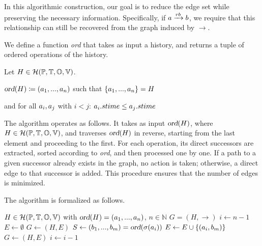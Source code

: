 \documentclass[12pt]{article}
\begin{document}
In this algorithmic construction, our goal is to reduce the edge set while preserving the necessary information. Specifically, if $a\xrightarrow{rb}b$, we require that this relationship can still be recovered from the graph induced by $\rightarrow$.

\vspace{1em}

We define a function \textsl{ord} that takes as input a history, and returns a tuple of ordered operations of the history.

\begin{nameddefinition}
Let $H\in\mathcal{H}(\mathbb{P}, \mathbb{T}, \mathbb{O}, \mathbb{V})$.

\begin{center}
$\textsl{ord}(H)\coloneq (a_1,...,a_n)$ such that $\{a_1,...,a_n\}=H$

and for all $a_i,a_j$ with $i< j$: $a_i.stime\leq a_j.stime$
\end{center}
\end{nameddefinition}

\vspace{1em}

The algorithm operates as follows. It takes as input $\textsl{ord}(H)$, where \mbox{$H\in\mathcal{H}(\mathbb{P}, \mathbb{T}, \mathbb{O}, \mathbb{V})$}, and traverses  $\textsl{ord}(H)$ in reverse, starting from the last element and proceeding to the first. For each operation, its direct successors are extracted, sorted according to \textsl{ord}, and then processed one by one. If a path to a given successor already exists in the graph, no action is taken; otherwise, a direct edge to that successor is added. This procedure ensures that the number of edges is minimized.

The algorithm is formalized as follows.

\begin{algorithm}[H]
\caption{Building a graph of history}\label{alg:alg1}
\begin{algorithmic}[1]
\Require $H\in\mathcal{H}(\mathbb{P}, \mathbb{T}, \mathbb{O}, \mathbb{V})$ with $\textsl{ord}(H)=(a_1,...,a_n)$, \mbox{$n \in \mathbb{N}$}
\Ensure $G=(H,\rightarrow)$
\State $i \gets n-1$
\State $E\gets\emptyset$
\State $G\gets (H,E)$
\State $S \gets (b_1,...,b_m)=\textsl{ord}(\sigma(a_i))$
	\State $E \gets E \cup \{ (a_i,b_m) \}$
	\State $G \gets (H,E)$
\EndIf
\EndFor
\State $i \gets i-1$
\EndWhile


\end{algorithmic}
\end{algorithm}
\end{document}
